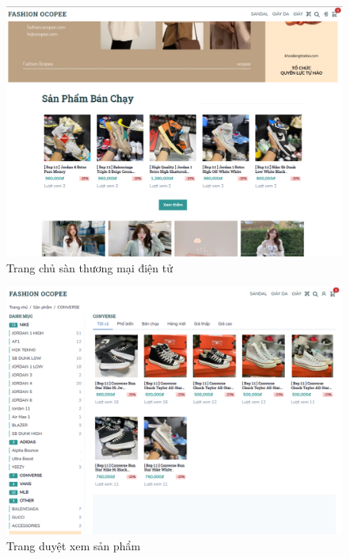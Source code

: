 \begin{figure}[!htbp]\fontsize{13px}{13px}\selectfont
	\begin{center}	
		\includegraphics[width=\textwidth]{./results/homepage}
		\caption{Trang chủ sàn thương mại điện tử}
	\end{center}
\end{figure}
\clearpage
\FloatBarrier
\begin{figure}[!htbp]\fontsize{13px}{13px}\selectfont
	\begin{center}	
		\includegraphics[width=\textwidth]{./results/categories-page}
		\caption{Trang duyệt xem sản phẩm}
	\end{center}
\end{figure}
\clearpage
\FloatBarrier
